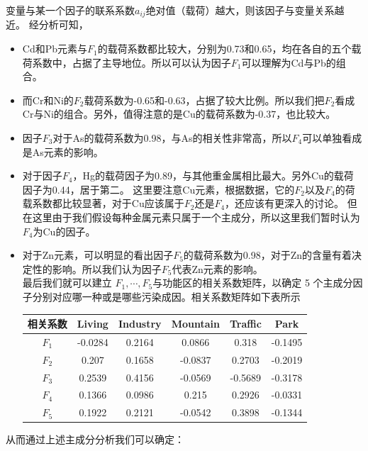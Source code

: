 \documentclass[a4paper]{article}
\begin{document}
变量与某一个因子的联系系数$a_{ij}$绝对值（载荷）越大，则该因子与变量关系越近。
经分析可知，
\begin{itemize}
\item Cd和Pb元素与$F_1$的载荷系数都比较大，分别为0.73和0.65，均在各自的五个载荷系数中，占据了主导地位。所以可以认为因子$F_1$可以理解为Cd与Pb的组合。
\item 而Cr和Ni的$F_2$载荷系数为-0.65和-0.63，占据了较大比例。所以我们把$F_2$看成Cr与Ni的组合。另外，值得注意的是Cu的载荷系数为-0.37，也比较大。
\item 因子$F_3$对于As的载荷系数为0.98，与As的相关性非常高，所以$F_4$可以单独看成是As元素的影响。
\item 对于因子$F_4$，Hg的载荷因子为0.89，与其他重金属相比最大。另外Cu的载荷因子为0.44，居于第二。
这里要注意Cu元素，根据数据，它的$F_2$以及$F_4$的荷载系数都比较显著，对于Cu应该属于$F_2$还是$F_4$，还应该有更深入的讨论。
但在这里由于我们假设每种金属元素只属于一个主成分，所以这里我们暂时认为$F_4$为Cu的因子。
\item 对于Zn元素，可以明显的看出因子$F_5$的载荷系数为0.98，对于Zn的含量有着决定性的影响。所以我们认为因子$F_5$代表Zn元素的影响。\\
\indent 最后我们就可以建立 $F_1,\cdots,F_5$与功能区的相关系数矩阵，以确定 5 个主成分因子分别对应哪一种或是哪些污染成因。相关系数矩阵如下表所示
\begin{table}[H]
		\centering
		\label{average-contend}
		\begin{tabular}{c|ccccc}
		    \hline                                 
			相关系数	  &    Living  &  Industry  &  Mountain  &  Traffic  &   Park    \\
			\hline
			 $F_1$        &    -0.0284   &   0.2164   & 0.0866   &     0.318 &    -0.1495    \\
			 $F_2$        &     0.207    &   0.1658  &   -0.0837 &     0.2703 &   -0.2019    \\
			 $F_3$        &     0.2539   &    0.4156 &  -0.0569  &   -0.5689  &   -0.3178    \\
			 $F_4$        &     0.1366   &   0.0986  &   0.215   &    0.2926  &   -0.0331    \\
			 $F_5$        &     0.1922   &   0.2121  &  -0.0542  &    0.3898  &   -0.1344    \\
			 \hline
		\end{tabular}
\end{table}
\end{itemize}
从而通过上述主成分分析我们可以确定：
\end{document}
